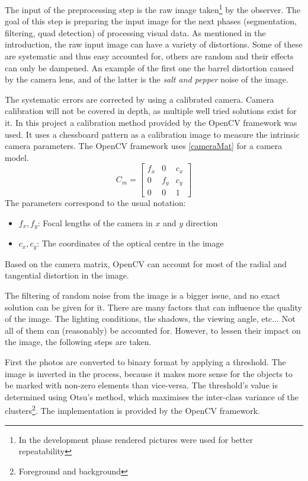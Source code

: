 The input of the preprocessing step is the raw image taken\footnote{In the development phase rendered pictures were used for better repeatability} by the observer.
The goal of this step is preparing the input image for the next phases (segmentation, filtering, quad detection) of processing visual data.
As mentioned in the introduction, the raw input image can have a variety of distortions.
Some of these are systematic and thus easy accounted for, others are random and their effects can only be dampened.
An example of the first one the barrel distortion caused by the camera lens, and of the latter is the \textit{salt and pepper} noise of the image.

The systematic errors are corrected by using a calibrated camera.
Camera calibration will not be covered in depth, as multiple well tried solutions exist for it.
In this project a calibration method provided by the OpenCV framework was used.
It uses a chessboard pattern as a calibration image to measure the intrinsic camera parameters.
The OpenCV framework uses \eqref{cameraMat} for a camera model.
\begin{equation}
	C_m = 
	\begin{bmatrix}
		f_x & 0   & c_x \\
		0   & f_y & c_y \\
		0   & 0   & 1
	\end{bmatrix}
	\label{eq:cameraMat}
\end{equation}
The parameters correspond to the usual notation:
\begin{itemize}
	\item $f_x, f_y$: Focal lengths of the camera in $x$ and $y$ direction
	\item $c_x, c_y$: The coordinates of the optical centre in the image
\end{itemize}
Based on the camera matrix, OpenCV can account for most of the radial and tangential distortion in the image.

The filtering of random noise from the image is a bigger issue, and no exact solution can be given for it.
There are many factors that can influence the quality of the image.
The lighting conditions, the shadows, the viewing angle, etc...
Not all of them can (reasonably) be accounted for.
However, to lessen their impact on the image, the following steps are taken.

First the photos are converted to binary format by applying a threshold.
The image is inverted in the process, because it makes more sense for the objects to be marked with non-zero elements than vice-versa.
The threshold's value is determined using Otsu's method, which maximises the inter-class variance of the clusters\footnote{Foreground and background}.
The implementation is provided by the OpenCV framework.

